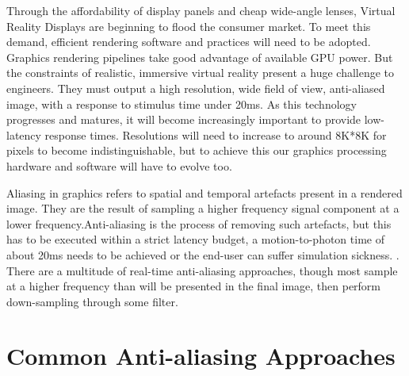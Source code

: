 \documentclass[12pt,a4paper,twoside,openright]{report}
\begin{document}
Through the affordability of display panels and cheap wide-angle lenses, Virtual Reality Displays are beginning to flood the consumer market. To meet this demand, efficient rendering software and practices will need to be adopted. Graphics rendering pipelines take good advantage of available GPU power. But the constraints of realistic, immersive virtual reality present a huge challenge to engineers. They must output a high resolution, wide field of view, anti-aliased image, with a response to stimulus time under 20ms. As this technology progresses and matures, it will become increasingly important to provide low-latency response times. Resolutions will need to increase to around 8K*8K \cite{abrash} for pixels to become indistinguishable, but to achieve this our graphics processing hardware and software will have to evolve too. \par Aliasing in graphics refers to spatial and temporal artefacts present in a rendered image. They are the result of sampling a higher frequency signal component at a lower frequency.Anti-aliasing is the process of removing such artefacts, but this has to be executed within a strict latency budget, a motion-to-photon time of about 20ms needs to be achieved or the end-user can suffer simulation sickness. \cite{MotionToPhoton}. There are a multitude of real-time anti-aliasing approaches, though most sample at a higher frequency than will be presented in the final image, then perform down-sampling through some filter. 

\section{Common Anti-aliasing Approaches}\label{supersampling}
\end{document}
